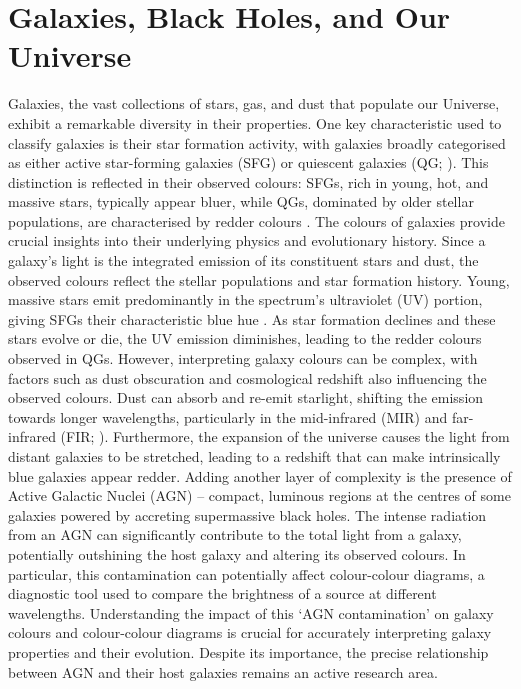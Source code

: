 \section{Galaxies, Black Holes, and Our Universe} %
Galaxies, the vast collections of stars, gas, and dust that populate our Universe, exhibit a remarkable diversity in their properties.  One key characteristic used to classify galaxies is their star formation activity, with galaxies broadly categorised as either active star-forming galaxies (SFG) or quiescent galaxies (QG; \citealt{whitaker_newfirm_2011}). This distinction is reflected in their observed colours: SFGs, rich in young, hot, and massive stars, typically appear bluer, while QGs, dominated by older stellar populations, are characterised by redder colours \citep{baldry_quantifying_2004}. The colours of galaxies provide crucial insights into their underlying physics and evolutionary history.  Since a galaxy's light is the integrated emission of its constituent stars and dust, the observed colours reflect the stellar populations and star formation history. Young, massive stars emit predominantly in the spectrum's ultraviolet (UV) portion, giving SFGs their characteristic blue hue \citep{madau_cosmic_2014}.  As star formation declines and these stars evolve or die, the UV emission diminishes, leading to the redder colours observed in QGs. However, interpreting galaxy colours can be complex, with factors such as dust obscuration and cosmological redshift also influencing the observed colours. Dust can absorb and re-emit starlight, shifting the emission towards longer wavelengths, particularly in the mid-infrared (MIR) and far-infrared (FIR; \citealt{madau_cosmic_2014}).  Furthermore, the expansion of the universe causes the light from distant galaxies to be stretched, leading to a redshift that can make intrinsically blue galaxies appear redder.
Adding another layer of complexity is the presence of Active Galactic Nuclei (AGN) – compact, luminous regions at the centres of some galaxies powered by accreting supermassive black holes. The intense radiation from an AGN can significantly contribute to the total light from a galaxy, potentially outshining the host galaxy and altering its observed colours. In particular, this contamination can potentially affect colour-colour diagrams, a diagnostic tool used to compare the brightness of a source at different wavelengths.  Understanding the impact of this `AGN contamination' on galaxy colours and colour-colour diagrams is crucial for accurately interpreting galaxy properties and their evolution. Despite its importance, the precise relationship between AGN and their host galaxies remains an active research area.
